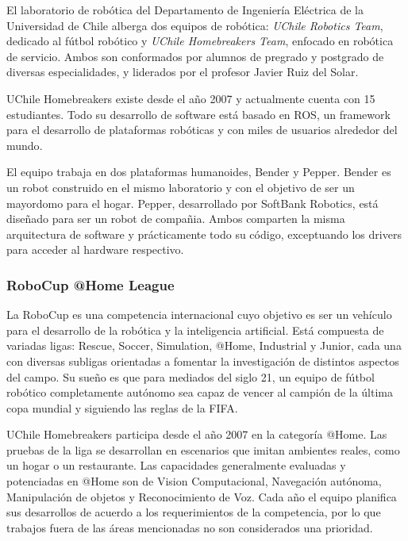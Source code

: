 El laboratorio de rob\'otica del Departamento de Ingenier\'ia El\'ectrica de la Universidad de Chile alberga dos equipos de rob\'otica: \textit{UChile Robotics Team}, dedicado al f\'utbol rob\'otico y \textit{UChile Homebreakers Team}, enfocado en rob\'otica de servicio. Ambos son conformados por alumnos de pregrado y postgrado de diversas especialidades, y liderados por el profesor Javier Ruiz del Solar\cite{uchile-robotics}.

UChile Homebreakers existe desde el a\~no 2007 y actualmente cuenta con 15 estudiantes. Todo su desarrollo de software est\'a basado en ROS, un framework para el desarrollo de plataformas rob\'oticas y con miles de usuarios alrededor del mundo\cite{ROS:2009}.

El equipo trabaja en dos plataformas humanoides, Bender y Pepper. Bender es un robot construido en el mismo laboratorio y con el objetivo de ser un mayordomo para el hogar. Pepper, desarrollado por SoftBank Robotics, est\'a dise\~nado para ser un robot de compa\~nia. Ambos comparten la misma arquitectura de software y pr\'acticamente todo su c\'odigo, exceptuando los drivers para acceder al hardware respectivo.


\subsubsection{RoboCup @Home League}


La RoboCup es una competencia internacional cuyo objetivo es ser un veh\'iculo para el desarrollo de la rob\'otica y la inteligencia artificial. Est\'a compuesta de variadas ligas: Rescue, Soccer, Simulation, @Home, Industrial y Junior, cada una con diversas subligas orientadas a fomentar la investigaci\'on de distintos aspectos del campo. Su sue\~no es que para mediados del siglo 21, un equipo de f\'utbol rob\'otico completamente aut\'onomo sea capaz de vencer al campi\'on de la \'ultima copa mundial y siguiendo las reglas de la FIFA\cite{robocup:rulebook_2017}.

UChile Homebreakers participa desde el a\~no 2007 en la categor\'ia @Home. Las pruebas de la liga se desarrollan en escenarios que imitan ambientes reales, como un hogar o un restaurante. 
% 
Las capacidades generalmente evaluadas y potenciadas en @Home son de Vision Computacional, Navegaci\'on aut\'onoma, Manipulaci\'on de objetos y Reconocimiento de Voz. Cada a\~no el equipo planifica sus desarrollos de acuerdo a los requerimientos de la competencia, por lo que trabajos fuera de las \'areas mencionadas no son considerados una prioridad.


